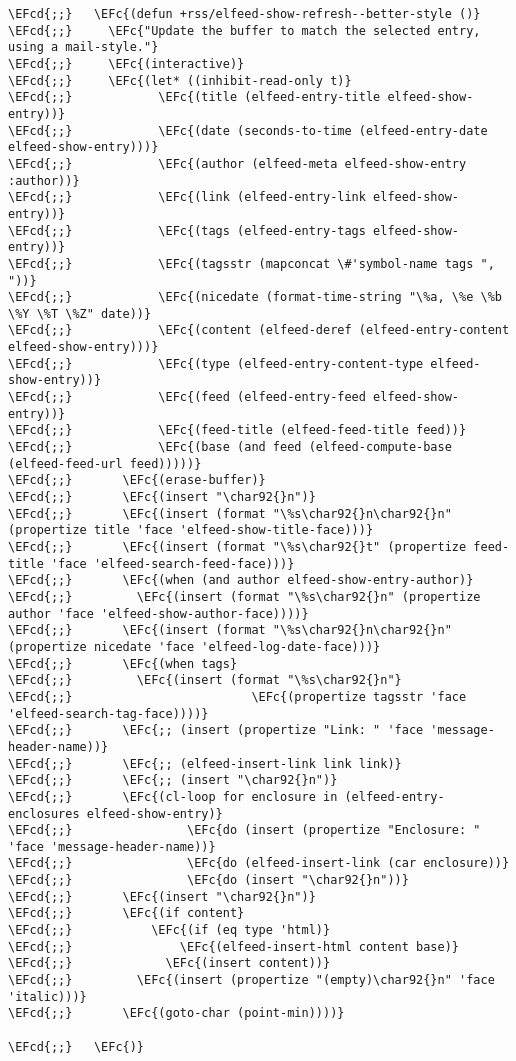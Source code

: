 \documentclass[12pt]{article}
\theoremstyle{plain}%
\theoremstyle{definition}
\theoremstyle{remark}
\newcommand{\EFc}[1]{\textcolor{EFc}{#1}} %
\newcommand{\EFcd}[1]{\textcolor{EFcd}{#1}} %
\begin{document}
\begin{Code}
\begin{Verbatim}
\EFcd{;;}   \EFc{(defun +rss/elfeed-show-refresh--better-style ()}
\EFcd{;;}     \EFc{"Update the buffer to match the selected entry, using a mail-style."}
\EFcd{;;}     \EFc{(interactive)}
\EFcd{;;}     \EFc{(let* ((inhibit-read-only t)}
\EFcd{;;}            \EFc{(title (elfeed-entry-title elfeed-show-entry))}
\EFcd{;;}            \EFc{(date (seconds-to-time (elfeed-entry-date elfeed-show-entry)))}
\EFcd{;;}            \EFc{(author (elfeed-meta elfeed-show-entry :author))}
\EFcd{;;}            \EFc{(link (elfeed-entry-link elfeed-show-entry))}
\EFcd{;;}            \EFc{(tags (elfeed-entry-tags elfeed-show-entry))}
\EFcd{;;}            \EFc{(tagsstr (mapconcat \#'symbol-name tags ", "))}
\EFcd{;;}            \EFc{(nicedate (format-time-string "\%a, \%e \%b \%Y \%T \%Z" date))}
\EFcd{;;}            \EFc{(content (elfeed-deref (elfeed-entry-content elfeed-show-entry)))}
\EFcd{;;}            \EFc{(type (elfeed-entry-content-type elfeed-show-entry))}
\EFcd{;;}            \EFc{(feed (elfeed-entry-feed elfeed-show-entry))}
\EFcd{;;}            \EFc{(feed-title (elfeed-feed-title feed))}
\EFcd{;;}            \EFc{(base (and feed (elfeed-compute-base (elfeed-feed-url feed)))))}
\EFcd{;;}       \EFc{(erase-buffer)}
\EFcd{;;}       \EFc{(insert "\char92{}n")}
\EFcd{;;}       \EFc{(insert (format "\%s\char92{}n\char92{}n" (propertize title 'face 'elfeed-show-title-face)))}
\EFcd{;;}       \EFc{(insert (format "\%s\char92{}t" (propertize feed-title 'face 'elfeed-search-feed-face)))}
\EFcd{;;}       \EFc{(when (and author elfeed-show-entry-author)}
\EFcd{;;}         \EFc{(insert (format "\%s\char92{}n" (propertize author 'face 'elfeed-show-author-face))))}
\EFcd{;;}       \EFc{(insert (format "\%s\char92{}n\char92{}n" (propertize nicedate 'face 'elfeed-log-date-face)))}
\EFcd{;;}       \EFc{(when tags}
\EFcd{;;}         \EFc{(insert (format "\%s\char92{}n"}
\EFcd{;;}                         \EFc{(propertize tagsstr 'face 'elfeed-search-tag-face))))}
\EFcd{;;}       \EFc{;; (insert (propertize "Link: " 'face 'message-header-name))}
\EFcd{;;}       \EFc{;; (elfeed-insert-link link link)}
\EFcd{;;}       \EFc{;; (insert "\char92{}n")}
\EFcd{;;}       \EFc{(cl-loop for enclosure in (elfeed-entry-enclosures elfeed-show-entry)}
\EFcd{;;}                \EFc{do (insert (propertize "Enclosure: " 'face 'message-header-name))}
\EFcd{;;}                \EFc{do (elfeed-insert-link (car enclosure))}
\EFcd{;;}                \EFc{do (insert "\char92{}n"))}
\EFcd{;;}       \EFc{(insert "\char92{}n")}
\EFcd{;;}       \EFc{(if content}
\EFcd{;;}           \EFc{(if (eq type 'html)}
\EFcd{;;}               \EFc{(elfeed-insert-html content base)}
\EFcd{;;}             \EFc{(insert content))}
\EFcd{;;}         \EFc{(insert (propertize "(empty)\char92{}n" 'face 'italic)))}
\EFcd{;;}       \EFc{(goto-char (point-min))))}

\EFcd{;;}   \EFc{)}
\end{Verbatim}
\end{Code}
\end{document}

